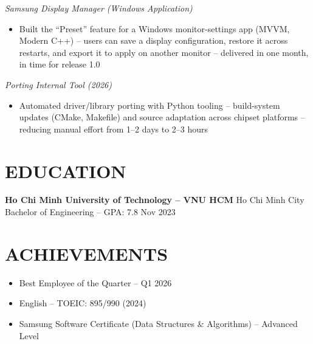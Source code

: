 \documentclass[a4paper,10pt]{article}
\newcommand{\project}[1]{\vspace{2pt}\textit{#1}\vspace{1pt}}
\begin{document}
\project{Samsung Display Manager (Windows Application)}
\begin{itemize}
    \item Built the ``Preset'' feature for a Windows monitor-settings app (MVVM, Modern C++) -- users
        can save a display configuration, restore it across restarts, and export it to apply on another
        monitor -- delivered in one month, in time for release 1.0
\end{itemize}

\project{Porting Internal Tool (2026)}
\begin{itemize}
    \item Automated driver/library porting with Python tooling -- build-system updates
          (CMake, Makefile) and source adaptation across chipset platforms --
          reducing manual effort from 1--2 days to 2--3 hours
\end{itemize}

\section*{EDUCATION}
\textbf{Ho Chi Minh University of Technology -- VNU HCM} \hfill Ho Chi Minh City \\
Bachelor of Engineering -- GPA: 7.8 \hfill Nov 2023

\section*{ACHIEVEMENTS}
\begin{itemize}
    \item Best Employee of the Quarter -- Q1 2026
    \item English -- TOEIC: 895/990 (2024)
    \item Samsung Software Certificate (Data Structures \& Algorithms) -- Advanced Level
\end{itemize}
\end{document}
